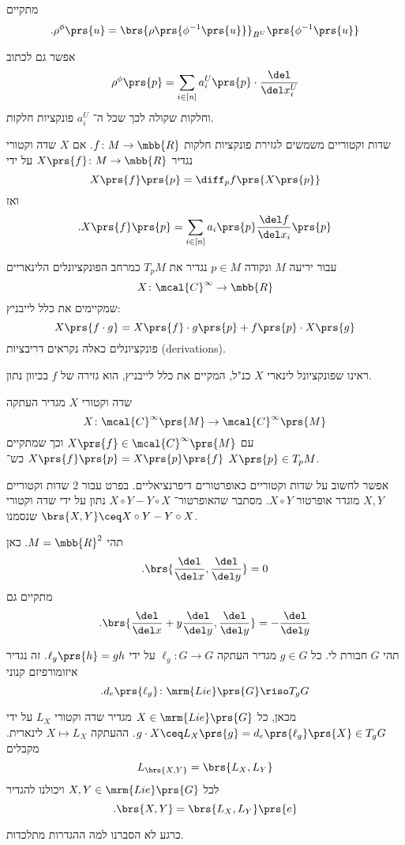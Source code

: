 \documentclass[10pt, twoside]{book}
\newcommand{\textenglish}[1]{\foreignlanguage{english}{#1}}
\newcommand{\Lie}{\mrm{Lie}}
\begin{document}
\begin{remark}
מתקיים
\[\text{.} \rho^\phi\prs{u} = \brs{\rho\prs{\phi^{-1}\prs{u}}}_{B^U}\prs{\phi^{-1}\prs{u}}\]

אפשר גם לכתוב
\[\rho^\phi\prs{p} = \sum_{i \in [n]} a_i^U\prs{p} \cdot \frac{\del}{\del x_i^U}\]
וחלקות שקולה לכך שכל ה־%
$a_i^U$
פונקציות חלקות.
\end{remark}

שדות וקטוריים משמשים לגזירת פונקציות חלקות
$f \colon M \to \mbb{R}$.
אם
$X$
שדה וקטורי נגדיר
$X\prs{f} \colon M \to \mbb{R}$
על ידי
\[X\prs{f}\prs{p} = \diff_p f \prs{X\prs{p}}\]
ואז
\[\text{.} X\prs{f} \prs{p} = \sum_{i \in [n]} a_i\prs{p} \frac{\del f}{\del x_i}\prs{p}\]



\begin{definition}
עבור יריעה
$M$
ונקודה
$p \in M$
נגדיר את
$T_p M$
כמרחב הפונקציונלים הלינאריים
\[X \colon \mcal{C}^\infty \to \mbb{R}\]
שמקיימים את כלל לייבניץ:
\[X\prs{f \cdot g} = X\prs{f} \cdot g\prs{p} + f\prs{p} \cdot X\prs{g}\]
פונקציונלים כאלה נקראים דריבציות \textenglish{(derivations)}.
\end{definition}

\begin{remark}
ראינו שפונקציונל לינארי
$X$
כנ"ל, המקיים את כלל לייבניץ, הוא גזירה של
$f$
בכיוון נתון.
\end{remark}

\begin{remark}
שדה וקטורי
$X$
מגדיר העתקה
\[X \colon \mcal{C}^\infty \prs{M} \to \mcal{C}^\infty \prs{M}\]
עם
$X\prs{f} \in \mcal{C}^\infty\prs{M}$
וכך שמתקיים
$X\prs{f}\prs{p} = X\prs{p}\prs{f}$
כש־%
$X\prs{p} \in T_p M$.

אפשר לחשוב על שדות וקטוריים כאופרטורים דיפרנציאליים.
בפרט עבור 2 שדות וקטוריים
$X,Y$
מוגדר אופרטור
$X \circ Y$.
מסתבר שהאופרטור־%
$X \circ Y - Y \circ X$
נתון על ידי שדה וקטורי שנסמנו
$\brs{X,Y} \ceq X \circ Y - Y \circ X$.
\end{remark}

\begin{example}
תהי
$M = \mbb{R}^2$.
כאן
\[\text{.}\brs{\frac{\del}{\del x}, \frac{\del}{\del y}} = 0\]
מתקיים גם
\[\text{.}\brs{\frac{\del}{\del x} + y \frac{\del}{\del y}, \frac{\del}{\del y}} = - \frac{\del}{\del y}\]
\end{example}

\begin{example}
תהי
$G$
חבורת לי.
כל
$g \in G$
מגדיר העתקה
$\ell_g \colon G \to G$
על ידי
$\ell_g\prs{h} = gh$.
זה נגדיר איזומורפיזם קנוני
\[\text{.} d_e\prs{\ell_g} \colon \Lie\prs{G} \riso T_g G\]

מכאן, כל
$X \in \Lie\prs{G}$
מגדיר שדה וקטורי
$L_X$
על ידי
$g \cdot X \ceq L_X\prs{g} = d_e\prs{\ell_g}\prs{X} \in T_g G$.
ההעתקה
$X \mapsto L_X$
לינארית.
מקבלים
\[L_{\brs{X,Y}} = \brs{L_X, L_Y}\]
לכל
$X,Y \in \Lie\prs{G}$
ויכולנו להגדיר
\[\text{.} \brs{X,Y} = \brs{L_X, L_Y} \prs{e}\]

כרגע לא הסברנו למה ההגדרות מתלכדות.
\end{example}
\end{document}

